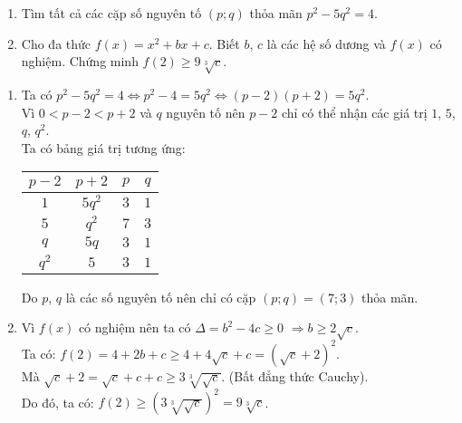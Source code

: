 \begin{ex}%
	\hfill
    \begin{enumerate}    
        \item Tìm tất cả các cặp số nguyên tố $(p;q)$ thỏa mãn $p^2-5q^2=4$.
        \item Cho đa thức $f(x)=x^2+bx+c$. Biết $b$, $c$ là các hệ số dương và $f(x)$ có nghiệm. Chứng minh $f(2) \geq 9\sqrt[3]{c}$.
    \end{enumerate}
\loigiai
    {
    \begin{enumerate}
        \item Ta có $p^2-5q^2=4 \Leftrightarrow p^2-4=5q^2 \Leftrightarrow (p-2)(p+2)=5q^2$.\\
        		Vì $0<p-2<p+2$ và $q$ nguyên tố nên $p-2$ chỉ có thể nhận các giá trị $1$, $5$, $q$, $q^2$.\\
        		Ta có bảng giá trị tương ứng:
        		\begin{center}
        			\begin{tabular}{|c|c|c|c|} 
        				\hline
    						$p-2$ & $p+2$ & $p$ & $q$ \\ 
    					\hline
    						$1$ & $5q^2$ & $3$ & $1$ \\ 
   						\hline
    						$5$ & $q^2$ & $7$ & $3$ \\ 
    					\hline
							$q$ & $5q$ & $3$ & $1$ \\ 
    					\hline
    						$q^2$ & $5$ & $3$ & $1$ \\ 
    					\hline
					\end{tabular}
        		\end{center}
        		Do $p$, $q$ là các số nguyên tố nên chỉ có cặp $(p;q)=(7;3)$ thỏa mãn.
        \item Vì $f(x)$ có nghiệm nên ta có $\Delta = b^2-4c \geq 0$ $\Rightarrow b \geq 2\sqrt{c}$.\\
        		Ta có: $f(2)=4+2b+c \geq 4+4\sqrt{c}+c=\left(\sqrt{c}+2\right)^2$.\\
        		Mà $\sqrt{c}+2=\sqrt{c}+c+c \geq 3\sqrt[3]{\sqrt{c}}$. (Bất đẳng thức Cauchy).\\
        		Do đó, ta có: $f(2) \geq \left(3\sqrt[3]{\sqrt{c}}\right)^2=9\sqrt[3]{c}$.
    \end{enumerate}
    }
\end{ex}


